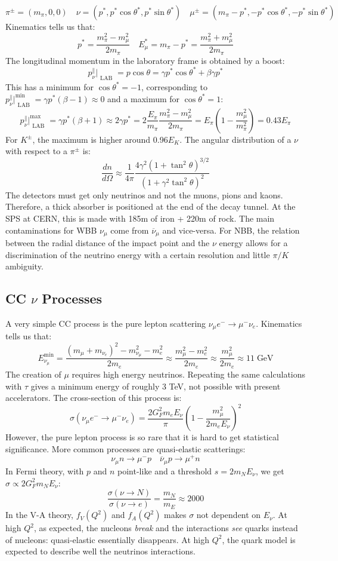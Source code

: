 \documentclass[10.75pt,a4paper,openright,bottom=2cm]{article}
\begin{document}
\[
\pi^\pm=(m_\pi,0,0) \quad \nu=(p^*,p^*\cos\theta^*, p^*\sin\theta^*) \quad \mu^\pm=(m_\pi-p^*,-p^*\cos\theta^*,-p^*\sin\theta^*)
\]
Kinematics tells us that:
\[
p^*=\frac{m_\pi^2-m_\mu^2}{2m_\pi} \quad E_\mu^*=m_\pi-p^*=\frac{m_\pi^2+m_\mu^2}{2m_\pi}
\]
The longitudinal momentum in the laboratory frame is obtained by a boost:
\[
p_\nu^\parallel\bigr|_{\substack{\text{LAB}}}=p\cos\theta=\gamma p^*\cos\theta^*+\beta\gamma p^*
\]
This has a minimum for $\cos\theta^*=-1$, corresponding to $p_\nu^\parallel\bigr|^{{\min}}_{\substack{\text{LAB}}}=\gamma p^*(\beta-1)\approx0$ and a maximum for $\cos\theta^*=1$:
\[
p_\nu^\parallel\bigr|^{{\max}}_{\substack{\text{LAB}}}=\gamma p^*(\beta+1)\approx2\gamma p^*=2\frac{E_\pi}{m_\pi}\frac{m_\pi^2-m_\mu^2}{2m_\pi}=E_\pi\left(1-\frac{m_\mu^2}{m_\pi^2}\right)=0.43E_\pi
\]
For $K^\pm$, the maximum is higher around 0.96$E_K$. The angular distribution of a $\nu$ with respect to a $\pi^\pm$ is:
\[
\frac{dn}{d\Omega}\approx\frac{1}{4\pi}\frac{4\gamma^2(1+\tan^2\theta)^{3/2}}{(1+\gamma^2\tan^2\theta)^2}
\]
The detectors must get only neutrinos and not the muons, pions and kaons. Therefore, a thick absorber is positioned at the end of the decay tunnel. At the SPS at CERN, this is made with 185m of iron + 220m of rock. The main contaminations for WBB $\nu_\mu$ come from $\overline{\nu}_\mu$ and vice-versa. For NBB, the relation between the radial distance of the impact point and the $\nu$ energy allows for a discrimination of the neutrino energy with a certain resolution and little $\pi/K$ ambiguity.
\subsection{CC $\nu$ Processes}
A very simple CC process is the pure lepton scattering $\nu_\mu e^-\to\mu^-\nu_e$. Kinematics tells us that:
\[
E_{\nu_\mu}^{\min}=\frac{(m_\mu+m_{\nu_e})^2-m_{\nu_\mu}^2-m_e^2}{2m_e}\approx\frac{m_\mu^2-m_e^2}{2m_e}\approx\frac{m_\mu^2}{2m_e}\approx11\;\text{GeV}
\]
The creation of $\mu$ requires high energy neutrinos. Repeating the same calculations with $\tau$ gives a minimum energy of roughly 3 TeV, not possible with present accelerators. The cross-section of this process is:
\[
\sigma(\nu_\mu e^-\to\mu^-\nu_e)=\frac{2G_F^2m_eE_\nu}{\pi}\left(1-\frac{m_\mu^2}{2m_eE_\nu}\right)^2
\]
However, the pure lepton process is so rare that it is hard to get statistical significance. More common processes are quasi-elastic scatterings:
\[
\nu_\mu n\to\mu^-p \quad \overline{\nu}_\mu p\to\mu^+n
\]
In Fermi theory, with $p$ and $n$ point-like and a threshold $s=2m_NE_\nu$, we get $\sigma\propto2G_F^2m_NE_\nu$:
\[
\frac{\sigma(\nu\to N)}{\sigma(\nu\to e)}=\frac{m_N}{m_E}\approx2000
\]
In the V-A theory, $f_V(Q^2)$ and $f_A(Q^2)$ makes $\sigma$ not dependent on $E_\nu$. At high $Q^2$, as expected, the nucleons \textit{break} and the interactions \textit{see} quarks instead of nucleons: quasi-elastic essentially disappears. At high $Q^2$, the quark model is expected to describe well the neutrinos interactions. 
\end{document}
